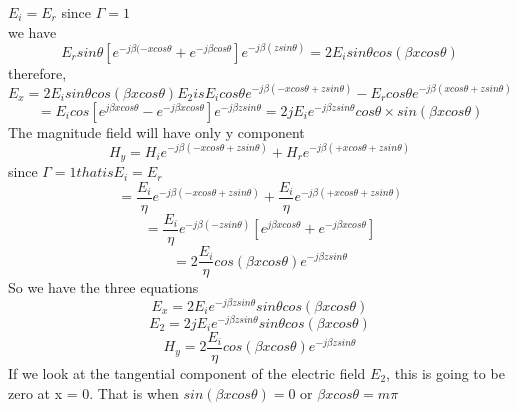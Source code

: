 $E_{i} =E_{r}$    since $\Gamma =1$\\
we have
\begin{dmath*}
E_{r}sin\theta [e^{-j\beta(-xcos\theta} + e^{-j\beta cos\theta}] e^{-j\beta(zsin\theta)} = 2E_{i}sin\theta cos(\beta xcos\theta)
\end{dmath*}
therefore,
\begin{dmath*}
E_x = 2E_{i}sin\theta cos(\beta xcos\theta)
E_{2} is E_{i}cos\theta e^{-j\beta(-xcos\theta + zsin\theta)} - E_{r}cos\theta e^{-j\beta(xcos\theta + zsin\theta)} 
\end{dmath*}
\begin{dmath*}
= E_{i}cos[e^{j\beta xcos\theta} - e^{-j\beta xcos\theta}]e^{-j\beta zsin\theta}
=2jE_{i}e^{-j\beta zsin\theta} cos\theta \times sin(\beta xcos\theta)
\end{dmath*}
The magnitude field will have only y component\\
\begin{equation*}
H_{y} = H_{i}e^{-j\beta(-xcos\theta + zsin\theta)} + H_{r}e^{-j\beta(+xcos\theta + zsin\theta)}
\end{equation*}
since $\Gamma = 1 that is E_{i}=E_{r}$\\
\begin{equation*}
= \frac{E_{i}}{\eta} e^{-j\beta(-xcos\theta + zsin\theta)} + \frac{E_{i}}{\eta}e^{-j\beta(+xcos\theta + zsin\theta)}
\end{equation*}
\begin{equation*}
=\frac{E_{i}}{\eta} e^{-j\beta(-zsin\theta)} [e^{j\beta xcos\theta} + e^{-j\beta xcos\theta}]
\end{equation*}
\begin{equation*}
= 2\frac{E_{i}}{\eta} cos(\beta xcos\theta)e^{-j\beta zsin\theta}
\end{equation*}
So we have the three equations
\begin{equation}
E_x = 2 E_{i} e^{-j\beta zsin\theta} sin\theta cos(\beta xcos\theta)
\end{equation}
\begin{equation}
E_2 = 2 jE_{i} e^{-j\beta zsin\theta} sin\theta cos(\beta xcos\theta)
\end{equation}
\begin{equation}
H_y = 2 \frac{E_{i}}{\eta} cos(\beta xcos\theta) e^{-j\beta zsin\theta} 
\end{equation}
If we look at the tangential component of the electric field $E_{2}$, this is going to be zero at x = 0. That is when $sin(\beta xcos\theta) =0$ or $\beta xcos\theta = m\pi$ 
